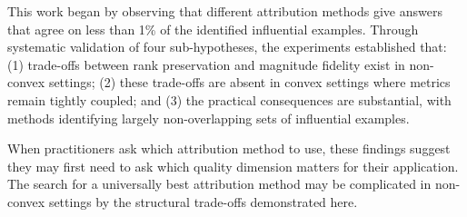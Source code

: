 
This work began by observing that different attribution methods give answers that agree on less than 1\% of the identified influential examples. Through systematic validation of four sub-hypotheses, the experiments established that: (1) trade-offs between rank preservation and magnitude fidelity exist in non-convex settings; (2) these trade-offs are absent in convex settings where metrics remain tightly coupled; and (3) the practical consequences are substantial, with methods identifying largely non-overlapping sets of influential examples.

When practitioners ask which attribution method to use, these findings suggest they may first need to ask which quality dimension matters for their application. The search for a universally best attribution method may be complicated in non-convex settings by the structural trade-offs demonstrated here.
